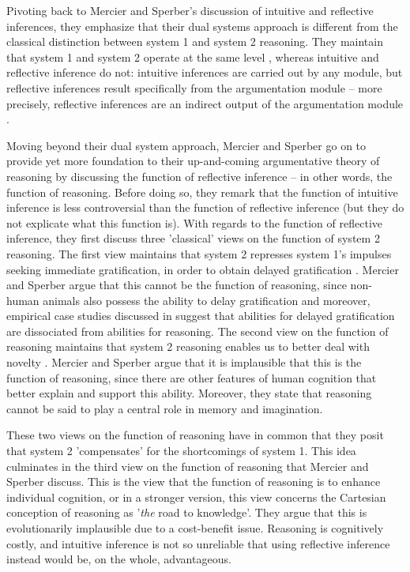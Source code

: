 Pivoting back to Mercier and Sperber's \citeyear{MS09} discussion of intuitive and reflective inferences, they emphasize that their dual systems approach is different from the classical distinction between system 1 and system 2 reasoning. They maintain that system 1 and system 2 operate at the same level , whereas intuitive and reflective inference do not: intuitive inferences are carried out by any module, but reflective inferences result specifically from the argumentation module -- more precisely, reflective inferences are an indirect output of the argumentation module \citep[p.~156]{MS09}.

Moving beyond their dual system approach, Mercier and Sperber go on to provide yet more foundation to their up-and-coming argumentative theory of reasoning by discussing the function of reflective inference -- in other words, the function of reasoning.
Before doing so, they remark that the function of intuitive inference is less controversial than the function of reflective inference (but they do not explicate what this function is).
With regards to the function of reflective inference, they first discuss three 'classical' views on the function of system 2 reasoning.
The first view maintains that system 2 represses system 1's impulses seeking immediate gratification, in order to obtain delayed gratification \citep{Sloman96}. Mercier and Sperber argue that this cannot be the function of reasoning, since non-human animals also possess the ability to delay gratification
and moreover, empirical case studies discussed in \citet{Damasio94} suggest that abilities for delayed gratification are dissociated from abilities for reasoning.
The second view on the function of reasoning maintains that system 2 reasoning enables us to better deal with novelty \citep{EvansOver1996}.
Mercier and Sperber argue that it is implausible that this is the function of reasoning, since there are other features of human cognition that better explain and support this ability. Moreover, they state that reasoning cannot be said to play a central role in memory and imagination.

These two views on the function of reasoning have in common that they posit that system 2 'compensates' for the shortcomings of system 1.
This idea culminates in the third view on the function of reasoning that Mercier and Sperber discuss. This is the view that the function of reasoning is to enhance individual cognition, or in a stronger version, this view concerns the Cartesian conception of reasoning as '\emph{the} road to knowledge'.
They argue that this is evolutionarily implausible due to a cost-benefit issue.
Reasoning is cognitively costly, and intuitive inference is not so unreliable that using reflective inference instead would be, on the whole, advantageous.

